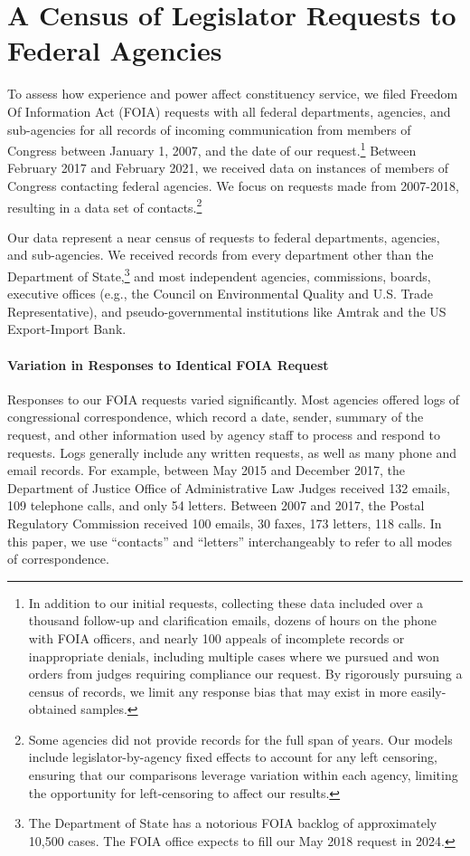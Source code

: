 \documentclass[12pt]{article}
\begin{document}
{%

\section{A Census of Legislator Requests to Federal Agencies} \label{s:data}
To assess how experience and power affect constituency service, we filed Freedom Of Information Act (FOIA) requests with all federal departments, agencies, and sub-agencies for all records of incoming communication from members of Congress between January 1, 2007, and the date of our request.\footnote{In addition to our initial requests, collecting these data included over a thousand follow-up and clarification emails, dozens of hours on the phone with FOIA officers, and nearly 100 appeals of incomplete records or inappropriate denials, including multiple cases where we pursued and won orders from judges requiring compliance our request. By rigorously pursuing a census of records, we limit any response bias that may exist in more easily-obtained samples.} Between February 2017 and February 2021, we received data on  instances of members of Congress contacting federal agencies. We focus on requests made from 2007-2018, resulting in a data set of  contacts.\footnote{Some agencies did not provide records for the full span of years. Our models include legislator-by-agency fixed effects to account for any left censoring, ensuring that our comparisons leverage variation within each agency, limiting the opportunity for left-censoring to affect our results.} 

Our data represent a near census of requests to federal departments, agencies, and sub-agencies. We received records from every department other than the Department of State,\footnote{The Department of State has a notorious FOIA backlog of approximately 10,500 cases. The FOIA office expects to fill our May 2018 request in 2024.} and most independent agencies, commissions, boards, executive offices (e.g., the Council on Environmental Quality and U.S. Trade Representative), and pseudo-governmental institutions like Amtrak and the US Export-Import Bank. 

\paragraph{Variation in Responses to Identical FOIA Request} Responses to our FOIA requests varied significantly. Most agencies offered logs of congressional correspondence, which record a date, sender, summary of the request, and other information used by agency staff to process and respond to requests. Logs generally include any written requests, as well as many phone and email records. For example, between May 2015 and December 2017, the Department of Justice Office of Administrative Law Judges received 132 emails, 109 telephone calls, and only 54 letters. Between 2007 and 2017, the Postal Regulatory Commission received 100 emails, 30 faxes, 173 letters, 118 calls. In this paper, we use ``contacts'' and ``letters'' interchangeably to refer to all modes of correspondence. 

}
\end{document}
